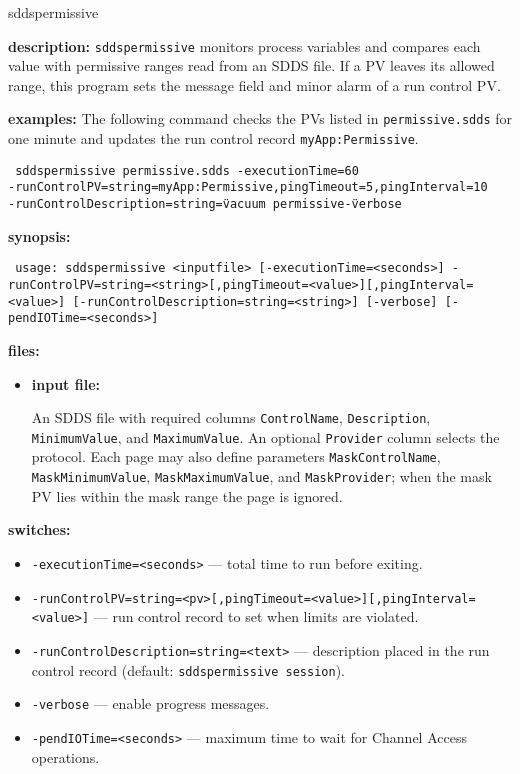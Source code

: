 %
\begin{sddsprog}{sddspermissive}
\item \textbf{description:}
\verb+sddspermissive+ monitors process variables and compares each value with
permissive ranges read from an SDDS file.  If a PV leaves its allowed range,
this program sets the message field and minor alarm of a run control PV.

\item \textbf{examples:}
The following command checks the PVs listed in \verb+permissive.sdds+ for one
minute and updates the run control record \verb+myApp:Permissive+.
\begin{flushleft}{\tt
sddspermissive permissive.sdds -executionTime=60\\
  -runControlPV=string=myApp:Permissive,pingTimeout=5,pingInterval=10\\
  -runControlDescription=string=\"vacuum permissive\" -verbose
}\end{flushleft}

\item \textbf{synopsis:}
\begin{flushleft}{\tt
usage: sddspermissive <inputfile>\
[-executionTime=<seconds>]\
-runControlPV=string=<string>[,pingTimeout=<value>][,pingInterval=<value>]\
[-runControlDescription=string=<string>]\
[-verbose] [-pendIOTime=<seconds>]
}\end{flushleft}

\item \textbf{files:}
\begin{itemize}
  \item \textbf{input file:}\par
An SDDS file with required columns \verb+ControlName+, \verb+Description+,
\verb+MinimumValue+, and \verb+MaximumValue+.  An optional \verb+Provider+
column selects the protocol.  Each page may also define parameters
\verb+MaskControlName+, \verb+MaskMinimumValue+, \verb+MaskMaximumValue+,
and \verb+MaskProvider+; when the mask PV lies within the mask range the page
is ignored.
\end{itemize}

\item \textbf{switches:}
\begin{itemize}
  \item {\tt -executionTime=<seconds>} --- total time to run before exiting.
  \item {\tt -runControlPV=string=<pv>[,pingTimeout=<value>][,pingInterval=<value>]} --- run
  control record to set when limits are violated.
  \item {\tt -runControlDescription=string=<text>} --- description placed in the run
  control record (default: \verb+sddspermissive session+).
  \item {\tt -verbose} --- enable progress messages.
  \item {\tt -pendIOTime=<seconds>} --- maximum time to wait for Channel Access operations.
\end{itemize}


\end{sddsprog}
